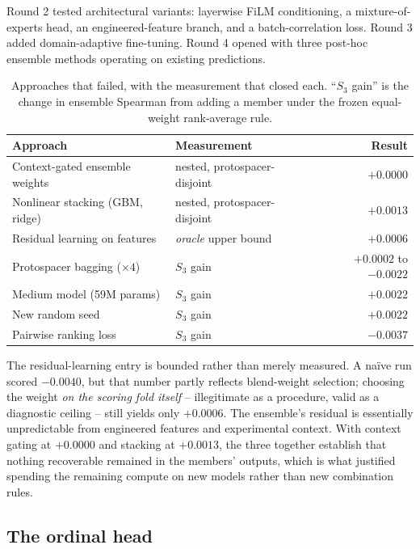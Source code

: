 \documentclass[11pt]{article}
\begin{document}
Round 2 tested architectural variants: layerwise FiLM conditioning, a
mixture-of-experts head, an engineered-feature branch, and a batch-correlation
loss. Round 3 added domain-adaptive fine-tuning. Round 4 opened with three
post-hoc ensemble methods operating on existing predictions.

\begin{table}[H]
\centering
\caption{Approaches that failed, with the measurement that closed each.
``$S_3$ gain'' is the change in ensemble Spearman from adding a member under the
frozen equal-weight rank-average rule.}
\label{tab:negatives}
\begin{tabular}{llr}
\toprule
Approach & Measurement & Result \\
\midrule
Context-gated ensemble weights & nested, protospacer-disjoint & $+0.0000$ \\
Nonlinear stacking (GBM, ridge) & nested, protospacer-disjoint & $+0.0013$ \\
Residual learning on features & \emph{oracle} upper bound & $+0.0006$ \\
Protospacer bagging ($\times 4$) & $S_3$ gain & $+0.0002$ to $-0.0022$ \\
Medium model (59M params) & $S_3$ gain & $+0.0022$ \\
New random seed & $S_3$ gain & $+0.0022$ \\
Pairwise ranking loss & $S_3$ gain & $-0.0037$ \\
\bottomrule
\end{tabular}
\end{table}

The residual-learning entry is bounded rather than merely measured. A na\"ive run
scored $-0.0040$, but that number partly reflects blend-weight selection; choosing
the weight \emph{on the scoring fold itself} -- illegitimate as a procedure, valid
as a diagnostic ceiling -- still yields only $+0.0006$. The ensemble's residual is
essentially unpredictable from engineered features and experimental context. With
context gating at $+0.0000$ and stacking at $+0.0013$, the three together
establish that nothing recoverable remained in the members' outputs, which is what
justified spending the remaining compute on new models rather than new combination
rules.

\subsection{The ordinal head}
\label{sec:ordinal}
\end{document}
